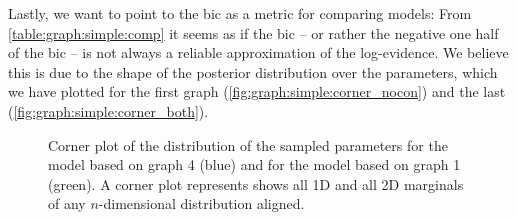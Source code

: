 \documentclass[\relativeRoot/main.tex]{subfiles}
\begin{document}
Lastly, we want to point to the \gls{bic} as a metric for comparing models: From \cref{table:graph:simple:comp} it seems as if the \gls{bic} -- or rather the negative one half of the \gls{bic} -- is not always a reliable approximation of the log-evidence. We believe this is due to the shape of the posterior distribution over the parameters, which we have plotted for the first graph (\cref{fig:graph:simple:corner_nocon}) and the last (\cref{fig:graph:simple:corner_both}).

\begin{figure}
    \centering
    \def\svgwidth{1.0\textwidth}
    
    \caption[
        Corner plots of the graphs no. 1 and no. 4
    ]{
        Corner plot of the distribution of the sampled parameters for the model based on graph 4 (blue) and for the model based on graph 1 (green). A corner plot represents shows all 1D and all 2D marginals of any $n$-dimensional distribution aligned.
    }
    \label{fig:graph:simple:corner}
\end{figure}
\end{document}
